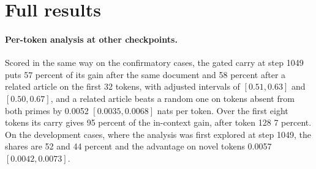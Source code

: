 \documentclass[12pt,a4paper]{report}
\begin{document}
\section{Full results}
\label{app-full}

\paragraph{Per-token analysis at other checkpoints.} Scored in the same way on the confirmatory cases, the gated carry at step 1049 puts 57 percent of its gain after the same document and 58 percent after a related article on the first 32 tokens, with adjusted intervals of $[0.51, 0.63]$ and $[0.50, 0.67]$, and a related article beats a random one on tokens absent from both primes by 0.0052 $[0.0035, 0.0068]$ nats per token. Over the first eight tokens its carry gives 95 percent of the in-context gain, after token 128 7 percent. On the development cases, where the analysis was first explored at step 1049, the shares are 52 and 44 percent and the advantage on novel tokens 0.0057 $[0.0042, 0.0073]$.
\end{document}
